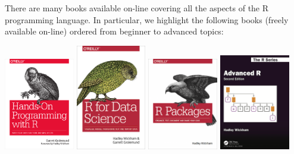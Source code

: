 \documentclass[
  11pt,
]{book}
\begin{document}
There are many books available on-line covering all the aspects of the R programming language. In particular, we highlight the following books (freely available on-line) ordered from beginner to advanced topics:

\begin{center}
  \includegraphics[width=0.23\textwidth]{images/coding/hopr.png}
  \includegraphics[width=0.23\textwidth]{images/coding/r4ds.png}
  \includegraphics[width=0.23\textwidth]{images/coding/r-pkgs.png}
  \includegraphics[width=0.23\textwidth]{images/coding/adv-r.png}
\end{center}
\end{document}
